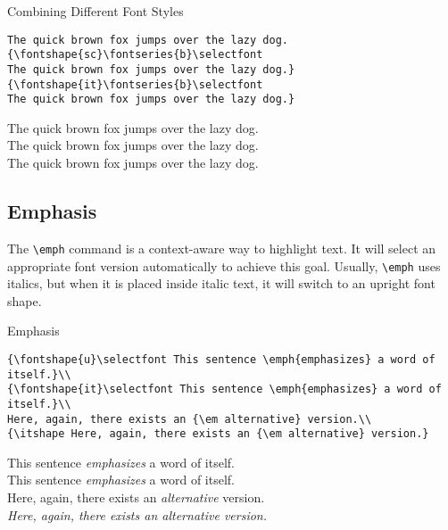 \documentclass[a4paper,oneside,11pt]{article}
\newcommand\comm[1]{\texttt{\textbackslash#1}}
\begin{document}
\begin{titled-frame}
{\textsf{Combining Different Font Styles}}
\vspace{-1em}
\begin{verbatim}
The quick brown fox jumps over the lazy dog.
{\fontshape{sc}\fontseries{b}\selectfont
The quick brown fox jumps over the lazy dog.}
{\fontshape{it}\fontseries{b}\selectfont
The quick brown fox jumps over the lazy dog.}
\end{verbatim}

\noindent The quick brown fox jumps over the lazy dog.\\
{\selectfont
The quick brown fox jumps over the lazy dog.}\\
{\selectfont
The quick brown fox jumps over the lazy dog.}
\end{titled-frame}

\subsection{Emphasis}

The  \comm{emph}  command  is  a   context-aware  way  to  highlight  text. It
will  select  an  appropriate  font  version  automatically  to  achieve  this
goal. Usually, \comm{emph} uses  italics, but when it is  placed inside italic
text, it will switch to an upright font shape.

\begin{titled-frame}
{\textsf{Emphasis}}
\vspace{-1em}
\small
\begin{verbatim}
{\fontshape{u}\selectfont This sentence \emph{emphasizes} a word of itself.}\\
{\fontshape{it}\selectfont This sentence \emph{emphasizes} a word of itself.}\\
Here, again, there exists an {\em alternative} version.\\
{\itshape Here, again, there exists an {\em alternative} version.}
\end{verbatim}
\normalsize
{\selectfont This sentence \emph{emphasizes} a word of itself.}\\
{\selectfont This sentence \emph{emphasizes} a word of itself.}\\
Here, again, there exists an {\em alternative} version.\\
{\itshape Here, again, there exists an {\em alternative} version.}
\end{titled-frame}
\end{document}
